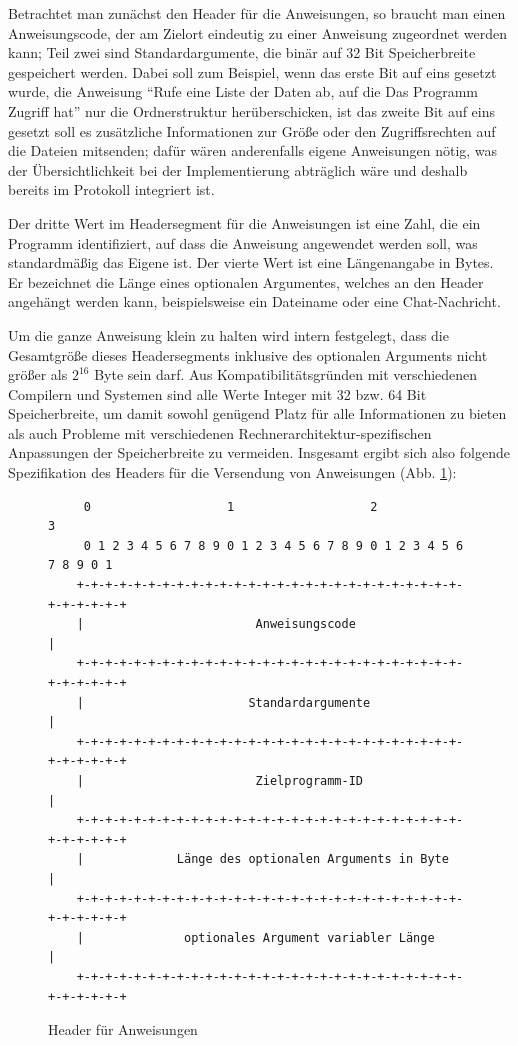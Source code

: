 Betrachtet man zunächst den Header für die Anweisungen, so braucht man einen Anweisungscode, der am Zielort eindeutig zu einer Anweisung zugeordnet werden kann; Teil zwei sind Standardargumente, die binär auf 32 Bit Speicherbreite gespeichert werden.
Dabei soll zum Beispiel, wenn das erste Bit auf eins gesetzt wurde, die Anweisung "`Rufe eine Liste der Daten ab, auf die Das Programm Zugriff hat"' nur die Ordnerstruktur herüberschicken, ist das zweite Bit auf eins gesetzt soll es zusätzliche Informationen zur Größe oder den Zugriffsrechten auf die Dateien mitsenden; dafür wären anderenfalls eigene Anweisungen nötig, was der Übersichtlichkeit bei der Implementierung abträglich wäre und deshalb bereits im Protokoll integriert ist.\par 
Der dritte Wert im Headersegment für die Anweisungen ist eine Zahl, die ein Programm identifiziert, auf dass die Anweisung angewendet werden soll, was standardmäßig das Eigene ist.
Der vierte Wert ist eine Längenangabe in Bytes.
Er bezeichnet die Länge eines optionalen Argumentes, welches an den Header angehängt werden kann, beispielsweise ein Dateiname oder eine Chat-Nachricht.\par 
Um die ganze Anweisung klein zu halten wird intern festgelegt, dass die Gesamtgröße dieses Headersegments inklusive des optionalen Arguments nicht größer als $2^{16}$ Byte sein darf.
Aus Kompatibilitätsgründen mit verschiedenen Compilern und Systemen sind alle Werte Integer mit 32 bzw. 64 Bit Speicherbreite, um damit sowohl genügend Platz für alle Informationen zu bieten als auch Probleme mit verschiedenen Rechnerarchitektur-spezifischen Anpassungen der Speicherbreite zu vermeiden.
Insgesamt ergibt sich also folgende Spezifikation des Headers für die Versendung von Anweisungen (Abb. \ref{Anweisungs_Header}):\par

\begin{figure}[h] 
\begin{lstlisting}
     0                   1                   2                   3
     0 1 2 3 4 5 6 7 8 9 0 1 2 3 4 5 6 7 8 9 0 1 2 3 4 5 6 7 8 9 0 1
    +-+-+-+-+-+-+-+-+-+-+-+-+-+-+-+-+-+-+-+-+-+-+-+-+-+-+-+-+-+-+-+-+
    |                        Anweisungscode                         |
    +-+-+-+-+-+-+-+-+-+-+-+-+-+-+-+-+-+-+-+-+-+-+-+-+-+-+-+-+-+-+-+-+
    |                       Standardargumente                       |
    +-+-+-+-+-+-+-+-+-+-+-+-+-+-+-+-+-+-+-+-+-+-+-+-+-+-+-+-+-+-+-+-+
    |                        Zielprogramm-ID                        |
    +-+-+-+-+-+-+-+-+-+-+-+-+-+-+-+-+-+-+-+-+-+-+-+-+-+-+-+-+-+-+-+-+
    |             Länge des optionalen Arguments in Byte            |
    +-+-+-+-+-+-+-+-+-+-+-+-+-+-+-+-+-+-+-+-+-+-+-+-+-+-+-+-+-+-+-+-+
    |              optionales Argument variabler Länge              |
    +-+-+-+-+-+-+-+-+-+-+-+-+-+-+-+-+-+-+-+-+-+-+-+-+-+-+-+-+-+-+-+-+
\end{lstlisting}
\caption{Header für Anweisungen}
\label{Anweisungs_Header}
\end{figure}

